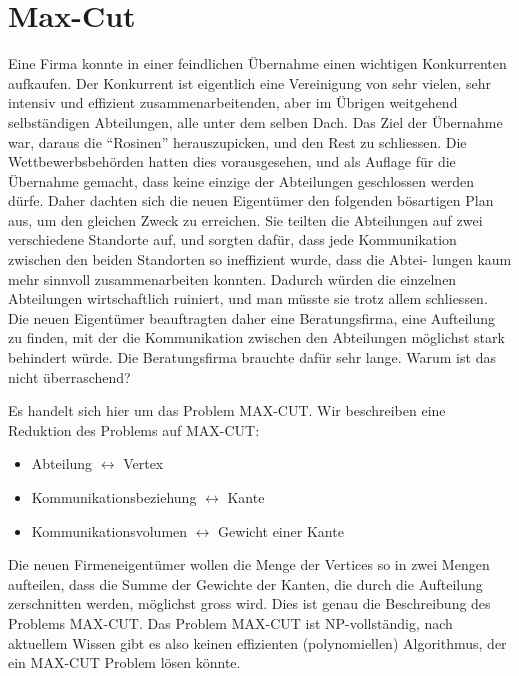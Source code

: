 \section{Max-Cut}

Eine Firma konnte in einer feindlichen Übernahme einen wichtigen Konkurrenten aufkaufen. Der Konkurrent ist eigentlich eine Vereinigung von sehr vielen, sehr intensiv und effizient zusammenarbeitenden, aber im Übrigen weitgehend selbständigen Abteilungen, alle unter dem selben Dach. Das Ziel der Übernahme war, daraus die “Rosinen” herauszupicken, und den Rest zu schliessen. Die Wettbewerbsbehörden hatten dies vorausgesehen, und als Auflage für die Übernahme gemacht, dass keine einzige der Abteilungen geschlossen werden dürfe. Daher dachten sich die neuen Eigentümer den folgenden bösartigen Plan aus, um den gleichen Zweck zu erreichen. Sie teilten die Abteilungen auf zwei verschiedene Standorte auf, und sorgten dafür, dass jede Kommunikation zwischen den beiden Standorten so ineffizient wurde, dass die Abtei- lungen kaum mehr sinnvoll zusammenarbeiten konnten. Dadurch würden die einzelnen Abteilungen wirtschaftlich ruiniert, und man müsste sie trotz allem schliessen. Die neuen Eigentümer beauftragten daher eine Beratungsfirma, eine Aufteilung zu finden, mit der die Kommunikation zwischen den Abteilungen möglichst stark behindert würde. Die Beratungsfirma brauchte dafür sehr lange. Warum ist das nicht überraschend?

Es handelt sich hier um das Problem MAX-CUT. Wir beschreiben eine Reduktion des Problems auf MAX-CUT:

\begin{itemize}
\item Abteilung $\leftrightarrow$ Vertex
\item Kommunikationsbeziehung $\leftrightarrow$ Kante
\item Kommunikationsvolumen $\leftrightarrow$ Gewicht einer Kante
\end{itemize}

Die neuen Firmeneigentümer wollen die Menge der Vertices so in zwei Mengen aufteilen, dass die Summe der Gewichte der Kanten, die durch die Aufteilung zerschnitten werden, möglichst gross wird. Dies ist genau die Beschreibung des Problems MAX-CUT. Das Problem MAX-CUT ist NP-vollständig, nach aktuellem Wissen gibt es also keinen effizienten (polynomiellen) Algorithmus, der ein MAX-CUT Problem lösen könnte.
